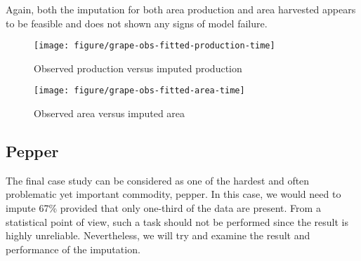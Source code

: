 \documentclass[nojss]{jss}\usepackage[]{graphicx}\usepackage[]{color}
\makeatletter
\def\maxwidth{ %
  \ifdim\Gin@nat@width>\linewidth
    \linewidth
  \else
    \Gin@nat@width
  \fi
}
\newenvironment{knitrout}{}{} %
\makeatother
\begin{document}
Again, both the imputation for both area production and area harvested
appears to be feasible and does not shown any signs of model failure.

\begin{knitrout}
\color{fgcolor}\begin{figure}[!ht]


{\centering \texttt{[image: figure/grape-obs-fitted-production-time]} 

}

\caption[Observed production versus imputed production]{Observed production versus imputed production\label{fig:grape-obs-fitted-production-time}}
\end{figure}


\end{knitrout}


\begin{knitrout}
\color{fgcolor}\begin{figure}[!ht]


{\centering \texttt{[image: figure/grape-obs-fitted-area-time]} 

}

\caption[Observed area versus imputed area]{Observed area versus imputed area\label{fig:grape-obs-fitted-area-time}}
\end{figure}


\end{knitrout}



\FloatBarrier
\subsection{Pepper}
The final case study can be considered as one of the hardest and often
problematic yet important commodity, pepper. In this case, we would
need to impute 67\% provided that only one-third of the data are
present. From a statistical point of view, such a task should not be
performed since the result is highly unreliable. Nevertheless, we will
try and examine the result and performance of the imputation.
\end{document}
